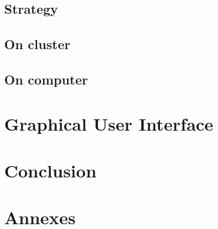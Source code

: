 \documentclass[12pt]{article}
\begin{document}
	\subsection{Strategy}			\label{sec:strategy}			
\newpage
	\subsection{On cluster}			\label{sec:cluster}			
	\subsection{On computer}		\label{sec:computer}			

\newpage
\section{Graphical User Interface}		\label{sec:gui}				

\newpage
	\section{Conclusion}			\label{sec:conclusion}			
\newpage
	\section{Annexes}			\label{sec:annexes}			
\newpage	



\end{document}

